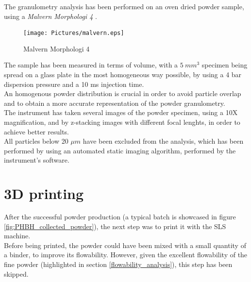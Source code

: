 \documentclass{article}
\begin{document}
        The granulometry analysis has been performed on an oven dried powder sample, 
        using a \textit{Malvern Morphologi 4} \autocites{Malvern_Morphologi4}. \\ 

        \begin{figure}[h!]
            \centering
            \texttt{[image: Pictures/malvern.eps]}
            \caption{Malvern Morphologi 4 \autocites{Malvern_Morphologi4}}
            \label{fig:morphologi4}
        \end{figure}

        The sample has been measured in terms of volume, with a $5 \ mm^3$ specimen being spread on a glass plate in the 
        most homogeneous way possible, by using a 4 bar dispersion pressure and a 10 ms injection time. \\ 

        An homogenous powder distribution is crucial in order to avoid particle overlap and to obtain a more accurate 
        representation of the powder granulometry. \\ 

        The instrument has taken several images of the powder specimen, using a 10X magnification, and by z-stacking 
        images with different focal lenghts, in order to achieve better results. \\

        All particles below 20 $\mu m$ have been excluded from the analysis, which has been performed by using an automated 
        static imaging algorithm, performed by the instrument's software. \\ 

      \clearpage

      \section{3D printing\label{SLS_printing_experimental}}

      After the successful powder production (a typical batch is showcased in figure \ref{fig:PHBH_collected_powder}), the next step was to print it with the SLS machine. \\
  
      Before being printed, the powder could have been mixed with a small quantity of a binder, to improve its flowability. 
      However, given the excellent flowability of the fine powder (highlighted in section \ref{flowability_analysis}), this step has been skipped. \\
  
\end{document}
